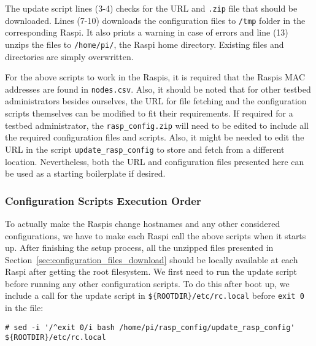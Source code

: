 The update script lines (3-4) checks for the \ac{URL} and \texttt{.zip} file that
should be downloaded. Lines (7-10) downloads the configuration files to \texttt{/tmp}
folder in the corresponding \ac{Raspi}. It also prints a warning in case of
errors and line (13) unzips the files to \texttt{/home/pi/}, the \ac{Raspi} home
directory. Existing files and directories are simply overwritten.

For the above scripts to work in the \ac{Raspi}s, it is required that the
\ac{Raspi}s \ac{MAC} addresses are found in \texttt{nodes.csv}. Also, it
should be noted that for other testbed administrators besides ourselves,
the \ac{URL} for file fetching and the configuration
scripts themselves can be modified to fit their requirements. If
required for a testbed administrator, the \texttt{rasp\_config.zip}
will need to be edited to include all the required configuration files
and scripts. Also, it might be needed to edit the \ac{URL} in the script
\texttt{update\_rasp\_config} to store and fetch from a different location.
Nevertheless, both the \ac{URL} and configuration files presented here can be
used as a starting boilerplate if desired.

\subsubsection{Configuration Scripts Execution Order}
To actually make the \ac{Raspi}s change hostnames and any other considered
configurations, we have to make each \ac{Raspi} call the above scripts when
it starts up. After finishing the setup process, all the unzipped files
presented in Section~\ref{sec:configuration_files_download} should be
locally available at each \ac{Raspi} after getting the root filesystem.
We first need to run the update script before running
any other configuration scripts. To do this after boot up, we include
a call for the update script in \texttt{\$\{ROOTDIR\}/etc/rc.local} before
\texttt{exit 0} in the file:


\Suppressnumber\begin{lstlisting}[]
# sed -i '/^exit 0/i bash /home/pi/rasp_config/update_rasp_config' ${ROOTDIR}/etc/rc.local
\end{lstlisting}
\FloatBarrier
\vspace{-5mm}

